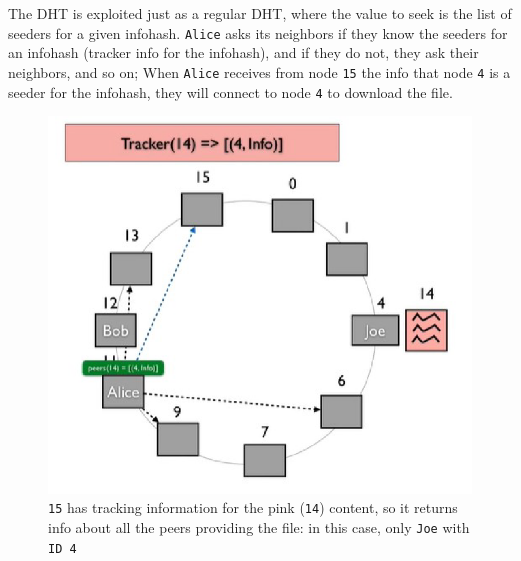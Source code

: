 \begin{paracol}{2}
   The DHT is exploited just as a regular DHT, where the value to seek is the list of seeders for a given infohash.
   \texttt{Alice} asks its neighbors if they know the seeders for an infohash (tracker info for the infohash), and if they do not, they ask their neighbors, and so on;
   When \texttt{Alice} receives from node \texttt{15} the info that node \texttt{4} is a seeder for the infohash, they will connect to node \texttt{4} to download the file.
   \switchcolumn
   \begin{figure}[htbp]
      \centering
      \includegraphics{images/bittorrent_dht.png}
      \caption{\texttt{15} has tracking information for the pink (\texttt{14}) content, so it returns info about all the peers providing the file: in this case, only \texttt{Joe} with \texttt{ID 4}}
      \label{fig:}
   \end{figure}
\end{paracol}
